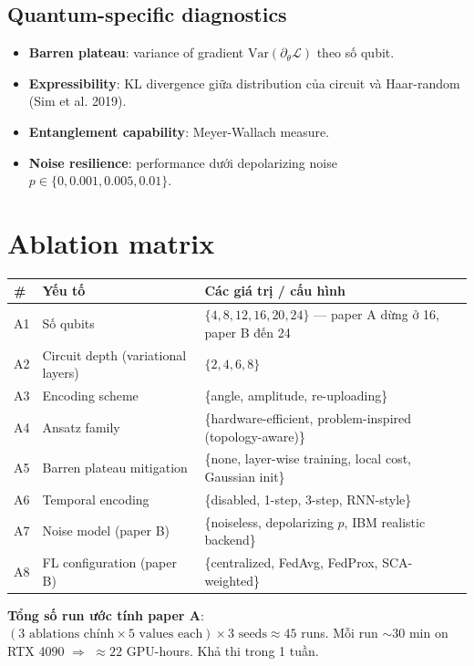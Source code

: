\documentclass[11pt,a4paper]{article}
\begin{document}
\subsection{Quantum-specific diagnostics}
\begin{itemize}
  \item \textbf{Barren plateau}: variance of gradient $\mathrm{Var}(\partial_\theta \mathcal{L})$ theo số qubit.
  \item \textbf{Expressibility}: KL divergence giữa distribution của circuit và Haar-random (Sim et al. 2019).
  \item \textbf{Entanglement capability}: Meyer-Wallach measure.
  \item \textbf{Noise resilience}: performance dưới depolarizing noise $p \in \{0, 0.001, 0.005, 0.01\}$.
\end{itemize}

\section{Ablation matrix}

\begin{longtable}{@{}p{0.6cm} p{3.8cm} p{10.6cm}@{}}
\toprule
\textbf{\#} & \textbf{Yếu tố} & \textbf{Các giá trị / cấu hình} \\
\midrule
\endhead
A1 & Số qubits & $\{4, 8, 12, 16, 20, 24\}$ --- paper A dừng ở 16, paper B đến 24 \\
A2 & Circuit depth (variational layers) & $\{2, 4, 6, 8\}$ \\
A3 & Encoding scheme & \{angle, amplitude, re-uploading\} \\
A4 & Ansatz family & \{hardware-efficient, problem-inspired (topology-aware)\} \\
A5 & Barren plateau mitigation & \{none, layer-wise training, local cost, Gaussian init\} \\
A6 & Temporal encoding & \{disabled, 1-step, 3-step, RNN-style\} \\
A7 & Noise model (paper B) & \{noiseless, depolarizing $p$, IBM realistic backend\} \\
A8 & FL configuration (paper B) & \{centralized, FedAvg, FedProx, SCA-weighted\} \\
\bottomrule
\end{longtable}

\textbf{Tổng số run ước tính paper A}: $(3 \text{ ablations chính} \times 5 \text{ values each}) \times 3 \text{ seeds} \approx 45$ runs. Mỗi run $\sim 30$ min on RTX 4090 $\Rightarrow$ $\approx 22$ GPU-hours. Khả thi trong 1 tuần.
\end{document}
